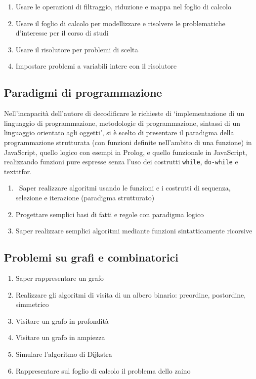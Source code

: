 \documentclass[a4paper]{easychair}
\begin{document}
\begin{enumerate}
  \item
    Usare le operazioni di filtraggio, riduzione e mappa nel foglio di
    calcolo
  \item
    Usare il foglio di calcolo per modellizzare e risolvere le
    problematiche d'interesse per il corso di studi
  \item
    Usare il risolutore per problemi di scelta
  \item
    Impostare problemi a variabili intere con il risolutore
\end{enumerate}

\subsection[Paradigmi]{Paradigmi di programmazione}

Nell'incapacità dell'autore di decodificare le richieste
di `implementazione di un linguaggio di programmazione,
metodologie di programmazione, sintassi di un linguaggio
orientato agli oggetti', si è scelto di presentare il paradigma
della programmazione strutturata (con funzioni definite nell'ambito 
di una funzione) in JavaScript, quello logico con esempi in Prolog,
e quello funzionale in JavaScript, realizzando funzioni pure espresse
senza l'uso dei costrutti \texttt{while}, \texttt{do-while} e texttt{for}.

\begin{enumerate}
  \item\
    Saper realizzare algoritmi usando le funzioni e 
    i costrutti di sequenza, selezione e iterazione (paradigma strutturato)
  \item
    Progettare semplici basi di fatti e regole con paradigma logico
  \item
    Saper realizzare semplici algoritmi mediante funzioni sintatticamente ricorsive
\end{enumerate}

\subsection[Grafi]{Problemi su grafi e combinatorici}

\begin{enumerate}
  \item Saper rappresentare un grafo
  \item
    Realizzare gli algoritmi di visita di un albero binario: preordine,
    postordine, simmetrico %
  \item
    Visitare un grafo in profondità
  \item
    Visitare un grafo in ampiezza
  \item
    Simulare l'algoritmo di Dijkstra
  \item Rappresentare sul foglio di calcolo il problema dello zaino
\end{enumerate}
\end{document}
